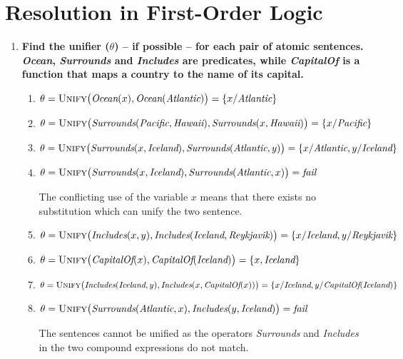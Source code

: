 \section{Resolution in First-Order Logic}

\begin{enumerate}

\item \textbf{Find the unifier ($\theta$) -- if possible -- for each pair of atomic sentences. \textit{Ocean}, \textit{Surrounds} and \textit{Includes} are predicates, while \textit{CapitalOf} is a function that maps a country to the name of its capital.}

\begin{enumerate}
\item
$\theta = \textsc{Unify}\big(\textit{Ocean}(x), \textit{Ocean}(\textit{Atlantic})\big) = \{x / \textit{Atlantic}\}$

\item
$\theta = \textsc{Unify}\big(\textit{Surrounds}(\textit{Pacific}, \textit{Hawaii}), \textit{Surrounds}(x, \textit{Hawaii})\big) = \{x / \textit{Pacific}\}$

\item
$\theta = \textsc{Unify}\big(\textit{Surrounds}(x, \textit{Iceland}), \textit{Surrounds}(\textit{Atlantic}, y)\big) = \{x / \textit{Atlantic}, y / \textit{Iceland}\}$

\item
$\theta = \textsc{Unify}\big(\textit{Surrounds}(x, \textit{Iceland}), \textit{Surrounds}(\textit{Atlantic}, x)\big) = \textit{fail}$

The conflicting use of the variable $x$ means that there exists no substitution which can unify the two sentence.

\item
$\theta = \textsc{Unify}\big(\textit{Includes}(x, y), \textit{Includes}(\textit{Iceland}, \textit{Reykjavik})\big) = \{x / \textit{Iceland}, y / \textit{Reykjavik}\}$

\item
$\theta = \textsc{Unify}\big(\textit{CapitalOf}(x), \textit{CapitalOf}(\textit{Iceland})\big) = \{x, \textit{Iceland}\}$

\item
$\theta = \textsc{Unify}\big(\textit{Includes}(\textit{Iceland}, y), \textit{Includes}(x, \textit{CapitalOf}(x))\big) = \{x / \textit{Iceland}, y / \textit{CapitalOf}(\textit{Iceland})\}$

\item
$\theta = \textsc{Unify}\big(\textit{Surrounds}(\textit{Atlantic}, x), \textit{Includes}(y, \textit{Iceland})\big) = \textit{fail}$

The sentences cannot be unified as the operators \textit{Surrounds} and \textit{Includes} in the two compound expressions do not match.

\end{enumerate}

\end{enumerate}



